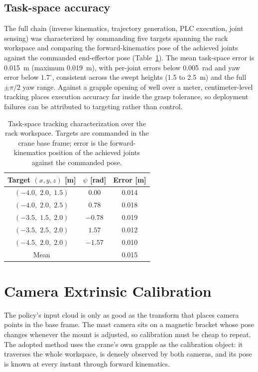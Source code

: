 \subsection{Task-space accuracy}

The full chain (inverse kinematics, trajectory generation, PLC execution,
joint sensing) was characterized by commanding five targets spanning the
rack workspace and comparing the forward-kinematics pose of the achieved
joints against the commanded end-effector pose
(Table~\ref{tab:s2r_tracking}). The mean task-space error is 0.015~m (maximum
0.019~m), with per-joint errors below 0.005~rad and yaw error below
$1.7^{\circ}$, consistent across the swept heights (1.5 to 2.5~m) and the
full $\pm \pi/2$ yaw range. Against a grapple opening of well over a meter,
centimeter-level tracking places execution accuracy far inside the grasp
tolerance, so deployment failures can be attributed to targeting rather than
control.

\begin{table}[t]
\centering
\caption{Task-space tracking characterization over the rack workspace.
Targets are commanded in the crane base frame; error is the
forward-kinematics position of the achieved joints against the commanded
pose.}
\label{tab:s2r_tracking}
\begin{tabular}{ccc}
\hline
\textbf{Target $(x, y, z)$ [m]} & $\psi$ \textbf{[rad]} & \textbf{Error [m]} \\
\hline
$(-4.0,\; 2.0,\; 1.5)$ & $0.00$ & 0.014 \\
$(-4.0,\; 2.0,\; 2.5)$ & $0.78$ & 0.018 \\
$(-3.5,\; 1.5,\; 2.0)$ & $-0.78$ & 0.019 \\
$(-3.5,\; 2.5,\; 2.0)$ & $1.57$ & 0.012 \\
$(-4.5,\; 2.0,\; 2.0)$ & $-1.57$ & 0.010 \\
\hline
Mean & & 0.015 \\
\hline
\end{tabular}
\end{table}

\section{Camera Extrinsic Calibration}
\label{sec:s2r_camcalib}

The policy's input cloud is only as good as the transform that places camera
points in the base frame. The mast camera sits on a magnetic bracket whose
pose changes whenever the mount is adjusted, so calibration must be cheap to
repeat. The adopted method uses the crane's own grapple as the calibration
object: it traverses the whole workspace, is densely observed by both
cameras, and its pose is known at every instant through forward kinematics.

